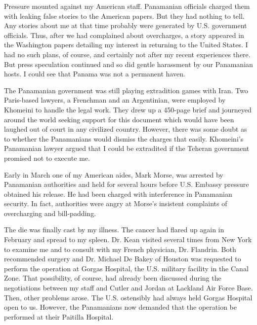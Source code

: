 Pressure mounted against my American staff. Panamanian officials charged them with leaking false stories to the American papers. But they had nothing to tell. Any stories about me at that time probably were generated by U.S. government officials. Thus, after we had complained about overcharges, a story appeared in the Washington papers detailing my interest in returning to the United States. I had no such plans, of course, and certainly not after my recent experiences there. But press speculation continued and so did gentle harassment by our Panamanian hosts. I could see that Panama was not a permanent haven. 

The Panamanian government was still playing extradition games with Iran. Two Paris-based lawyers, a Frenchman and an Argentinian, were employed by Khomeini to handle the legal work. They drew up a 450-page brief and journeyed around the world seeking support for this document which would have been laughed out of court in any civilized country. However, there was some doubt as to whether the Panamanians would dismiss the charges that easily. Khomeini’s Panamanian lawyer argued that I could be extradited if the Teheran government promised not to execute me. 

Early in March one of my American aides, Mark Morse, was arrested by Panamanian authorities and held for several hours before U.S. Embassy pressure obtained his release. He had been charged with interference in Panamanian security. In fact, authorities were angry at Morse’s insistent complaints of overcharging and bill-padding. 

The die was finally cast by my illness. The cancer had flared up again in February and spread to my spleen. Dr. Kean visited several times from New York to examine me and to consult with my French physician, Dr. Flandrin. Both recommended surgery and Dr. Michael De Bakey of Houston was requested to perform the operation at Gorgas Hospital, the U.S. military facility in the Canal Zone. That possibility, of course, had already been discussed during the negotiations between my staff and Cutler and Jordan at Lackland Air Force Base. Then, other problems arose. The U.S. ostensibly had always held Gorgas Hospital open to us. However, the Panamanians now demanded that the operation be performed at their Paitilla Hospital. 

